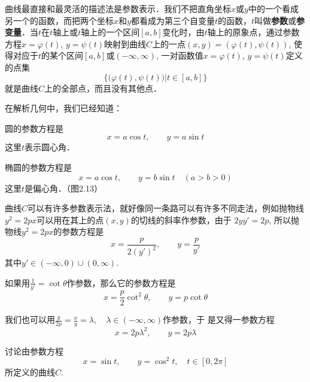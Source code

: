 曲线最直接和最灵活的描述法是参数表示．我们不把直角坐标$x$或$y$中的一个看成另一个的函数，而把两个坐标$x$和$y$都看成为第三个自变量$t$的函数，$t$叫做\textbf{参数}或\textbf{参变量}．当$t$在$t$轴上或$t$轴上的一个区间$[a,b]$变化时，由$t$轴上的原象点，通过参数方程$x=\varphi(t)$, $y=\psi(t)$映射到曲线$C$上的一点$(x,y)=(\varphi(t),\psi(t))$, 使得对应于$t$的某个区间$[a,b]$或$(-\infty, \infty)$, 一对函数值$x=\varphi(t)$, $y=\psi(t)$定义的点集
$$\Big\{\big(\varphi(t), \psi(t)\big)\Big|t\in [a,b]\Big\}$$
就是曲线$C$上的全部点，而且没有其他点．

在解析几何中，我们已经知道：

圆的参数方程是
\[x=a\cos t,\qquad y=a\sin t\]
这里$t$表示圆心角．

椭圆的参数方程是
\[x=a\cos t,\qquad y=b\sin t\quad (a>b>0)\]
这里$t$是偏心角．（图2.13）

\begin{figure}[htp]
    \centering
{}
    \caption{}
\end{figure}

曲线$C$可以有许多参数表示法，就好像同一条路可以有许多不同走法，例如抛物线$y^2=2px$可以用在其上的点$(x,y)$的切线的斜率作参数，由于
$2yy'=2p$, 所以抛物线$y^2=2px$的参数方程是
\[x=\frac{p}{2(y')^2},\qquad y=\frac{p}{y'}\]
其中$y'\in (-\infty,0)\cup (0, \infty)$.

如果用$\frac{1}{y'}=\cot\theta$作参数，那么它的参数方程是
\[x=\frac{p}{2}\cot^2 \theta,\qquad y=p\cot\theta\]

我们也可以用$\frac{y}{2p}=\frac{x}{y}=\lambda,\quad \lambda\in (-\infty, \infty)$作参数，于
是又得一参数方程
\[x=2p\lambda^2,\qquad y=2p\lambda\]


\begin{example}
讨论由参数方程
\[x=\sin t,\qquad y=\cos^2 t,\quad t\in[0,2\pi]\]
所定义的曲线$C$.
\end{example}

